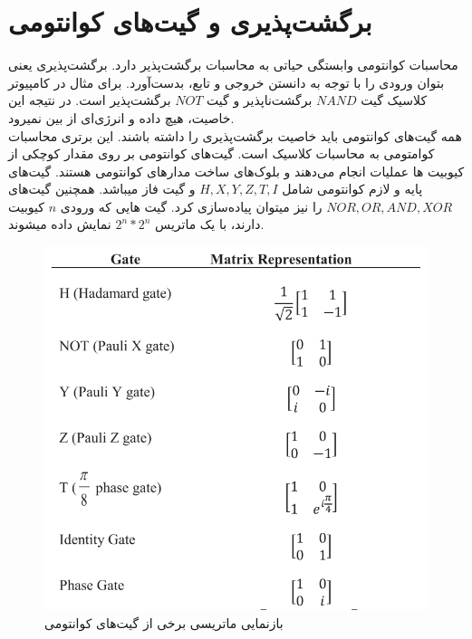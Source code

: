 \section{برگشت‌پذیری و گیت‌های کوانتومی}
محاسبات کوانتومی وابستگی حیاتی به محاسبات برگشت‌پذیر
 دارد. برگشت‌پذیری یعنی بتوان ورودی را با توجه به دانستن خروجی و تابع، بدست‌آورد. برای مثال در کامپیوتر کلاسیک گیت‌ $NAND$ برگشت‌ناپذیر و گیت $NOT$ برگشت‌پذیر است. در نتیجه این خاصیت، هیچ داده و انرژی‌ای از بین نمیرود.
\\
همه گیت‌های کوانتومی باید خاصیت برگشت‌پذیری را داشته باشند. این برتری محاسبات کوامتومی به محاسبات کلاسیک است. گیت‌های کوانتومی بر روی مقدار کوچکی از کیوبیت ها عملیات انجام می‌دهند و بلوک‌های ساخت مدارهای کوانتومی هستند. گیت‌های پایه و لازم کوانتومی شامل $H, X, Y, Z, T, I$ و گیت فاز
میباشد. همچنین گیت‌های $NOR, OR, AND, XOR$ را نیز میتوان پیاده‌سازی کرد. گیت هایی که ورودی $n$ کیوبیت دارند، با یک ماتریس $2^{n} * 2^{n}$ نمایش داده میشوند.
\cite{fundamentalsandapplications}
\begin{figure}[!h]
\centerline{\includegraphics[width=.7\textwidth]{gates.png}}
\caption{بازنمایی ماتریسی برخی از گیت‌های کوانتومی}
\end{figure}